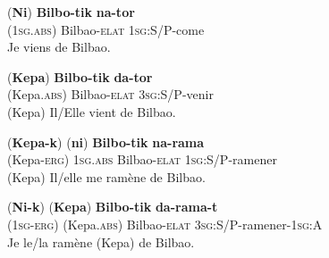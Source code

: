 \documentclass[oldfontcommands,twoside,a4paper,12pt]{article}
\newcommand{\ipa}[1]{{\phon\textbf{#1}}}
\begin{document}
\begin{landscape}
\begin{exe}
\ex 
\label{ex:1a}
\gll (\ipa{Ni}) \ipa{Bilbo-tik} \ipa{na-tor}\\
(\textsc{1sg.abs}) {Bilbao-\textsc{elat}} {\textsc{1sg}:S/P-come}\\ %
\trans Je viens de Bilbao.
\end{exe}

\begin{exe}
\ex 
\label{ex:1a}
\gll (\ipa{Kepa}) \ipa{Bilbo-tik} \ipa{da-tor}\\
(Kepa.\textsc{abs}) {Bilbao-\textsc{elat}} {\textsc{3sg}:S/P-venir}\\ %
\trans (Kepa) Il/Elle vient de Bilbao.
\end{exe}


\begin{exe}
\ex 
\label{ex:1a}
\gll (\ipa{Kepa-k}) (\ipa{ni}) \ipa{Bilbo-tik} \ipa{na-rama}\\
(Kepa-\textsc{erg}) {\textsc{1sg.abs}} {Bilbao-\textsc{elat}} {\textsc{1sg}:S/P-ramener}\\ %
\trans (Kepa) Il/elle me ramène de Bilbao.
\end{exe}

\begin{exe}
\ex 
\label{ex:1a}
\gll (\ipa{Ni-k}) (\ipa{Kepa}) \ipa{Bilbo-tik} \ipa{da-rama-t}\\
({\textsc{1sg-erg}}) (Kepa.\textsc{abs}) {Bilbao-\textsc{elat}} {\textsc{3sg}:S/P-ramener-\textsc{1sg:A}}\\ %
\trans Je le/la ramène (Kepa) de Bilbao.
\end{exe}
 


\end{landscape}
\end{document}
